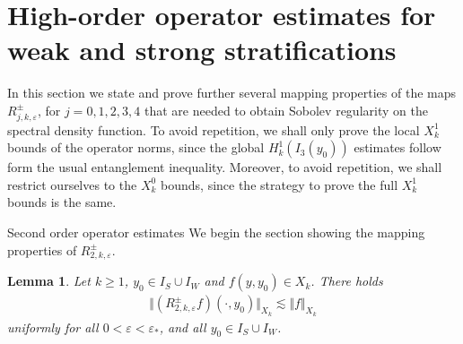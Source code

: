 \documentclass[11pt,reqno]{amsproc}
\makeatletter
\renewcommand\subsection{\@startsection{subsection}{2}%
\normalparindent{.5\linespacing\@plus.7\linespacing}{-.5em}
{\normalfont\bfseries}}
\newtheorem{lemma}[proposition]{Lemma}
\theoremstyle{definition}
\numberwithin{equation}{section}
\newcommand{\ep}{\varepsilon}
\makeatother
\begin{document}
\section{High-order operator estimates for weak and strong stratifications}\label{sec:highorderweakstrong}
In this section we state and prove further several mapping properties of the maps $R_{j,k,\ep}^\pm$, for $j=0,1,2,3,4$ that are needed to obtain Sobolev regularity on the spectral density function. To avoid repetition, we shall only prove the local $X_k^1$ bounds of the operator norms, since the global $H_k^1(I_3(y_0))$ estimates follow form the usual entanglement inequality. Moreover, to avoid repetition, we shall restrict ourselves to the $X^0_k$ bounds, since the strategy to prove the full $X_k^1$ bounds is the same. 

\subsection{Second order operator estimates}
We begin the section showing the mapping properties of $R_{2,k,\ep}^\pm$.
\begin{lemma}\label{lemma:R2mapsXktoXk}
Let $k\geq 1$, $y_0\in I_S\cup I_W$ and $f(y,y_0)\in X_k$. There holds
\begin{align*}
\Vert (R_{2,k,\ep}^\pm f)(\cdot,y_0) \Vert_{X_k} \lesssim  \Vert f \Vert_{X_k} 
\end{align*}
uniformly for all $0<\ep < \ep_*$, and all $y_0\in I_S\cup I_W$.
\end{lemma}
\end{document}
